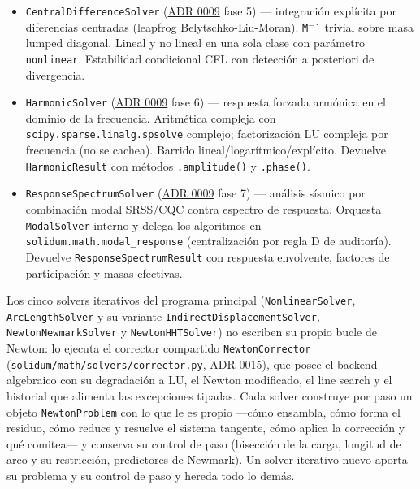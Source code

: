 \documentclass[11pt,oneside]{report}
\begin{document}
\begin{itemize}
  \item \texttt{CentralDifferenceSolver} (\hyperref[adr:0009]{ADR 0009} fase 5) --- integración explícita por diferencias centradas (leapfrog Belytschko-Liu-Moran). \texttt{M\ensuremath{^{-}}¹} trivial sobre masa lumped diagonal. Lineal y no lineal en una sola clase con parámetro \texttt{nonlinear}. Estabilidad condicional CFL con detección a posteriori de divergencia.
  \item \texttt{HarmonicSolver} (\hyperref[adr:0009]{ADR 0009} fase 6) --- respuesta forzada armónica en el dominio de la frecuencia. Aritmética compleja con \texttt{scipy.\allowbreak{}sparse.\allowbreak{}linalg.\allowbreak{}spsolve} complejo; factorización LU compleja por frecuencia (no se cachea). Barrido lineal/logarítmico/explícito. Devuelve \texttt{HarmonicResult} con métodos \texttt{.amplitude()} y \texttt{.phase()}.
  \item \texttt{ResponseSpectrumSolver} (\hyperref[adr:0009]{ADR 0009} fase 7) --- análisis sísmico por combinación modal SRSS/CQC contra espectro de respuesta. Orquesta \texttt{ModalSolver} interno y delega los algoritmos en \texttt{solidum.\allowbreak{}math.\allowbreak{}modal\_\allowbreak{}response} (centralización por regla D de auditoría). Devuelve \texttt{ResponseSpectrumResult} con respuesta envolvente, factores de participación y masas efectivas.
\end{itemize}

Los cinco solvers iterativos del programa principal (\texttt{NonlinearSolver}, \texttt{ArcLengthSolver} y su variante \texttt{IndirectDisplacementSolver}, \texttt{NewtonNewmarkSolver} y \texttt{NewtonHHTSolver}) no escriben su propio bucle de Newton: lo ejecuta el corrector compartido \texttt{NewtonCorrector} (\texttt{solidum/\allowbreak{}math/\allowbreak{}solvers/\allowbreak{}corrector.\allowbreak{}py}, \hyperref[adr:0015]{ADR 0015}), que posee el backend algebraico con su degradación a LU, el Newton modificado, el line search y el historial que alimenta las excepciones tipadas. Cada solver construye por paso un objeto \texttt{NewtonProblem} con lo que le es propio ---cómo ensambla, cómo forma el residuo, cómo reduce y resuelve el sistema tangente, cómo aplica la corrección y qué comitea--- y conserva su control de paso (bisección de la carga, longitud de arco y su restricción, predictores de Newmark). Un solver iterativo nuevo aporta su problema y su control de paso y hereda todo lo demás.
\end{document}
